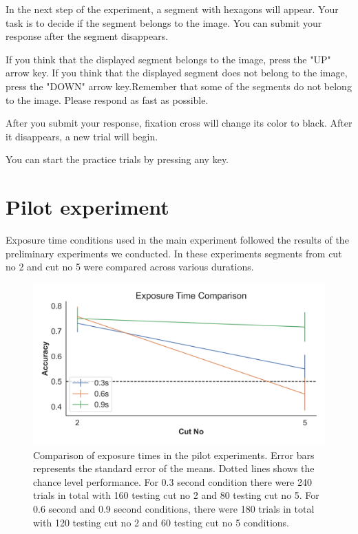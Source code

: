 \documentclass{article}
\begin{document}
In the next step of the experiment, a segment with hexagons will appear.
Your task is to decide if the segment belongs to the image. You can submit your response after the segment disappears.

If you think that the displayed segment belongs to the image, press the "UP" arrow key. If you think that the displayed segment does not belong to the image, press the "DOWN" arrow key.Remember that some of the segments do not belong to the image. Please respond as fast as possible.

After you submit your response, fixation cross will change its color to black. After it disappears, a new trial will begin.

You can start the practice trials by pressing any key.
\clearpage

\section{Pilot experiment}
\label{pilotExp}
Exposure time conditions used in the main experiment followed the results of the preliminary experiments we conducted. In these experiments segments from cut no 2 and cut no 5 were compared across various durations. 

\begin{figure}[hb]
    \centering    
    \includegraphics[width = \textwidth]{plots/ExpTimeComparison.png}
    \caption{Comparison of exposure times in the pilot experiments. Error bars represents the standard error of the means. Dotted lines shows the chance level performance. For 0.3 second condition there were 240 trials in total with 160 testing cut no 2 and 80 testing cut no 5. For 0.6 second and 0.9 second conditions, there were 180 trials in total with 120 testing cut no 2 and 60 testing cut no 5 conditions.}
    \label{fig:expTimeComparison}
\end{figure}
\end{document}
